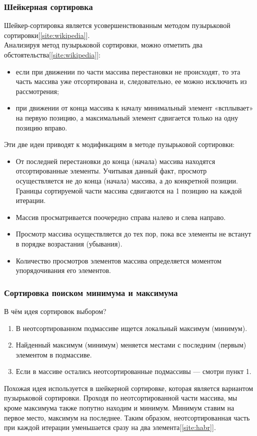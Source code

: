 \documentclass[a4paper,12pt]{article}
\begin{document}
\subsubsection{Шейкерная сортировка}
Шейкер-сортировка является усовершенствованным методом пузырьковой сортировки[\ref{site:wikipedia}]. \\
Анализируя метод пузырьковой сортировки, можно отметить два обстоятельства[\ref{site:wikipedia}]:
\begin{itemize}
\item если при движении по части массива перестановки не происходят, то эта часть массива уже отсортирована и, следовательно, ее можно исключить из рассмотрения;
\item при движении от конца массива к началу минимальный элемент «всплывает» на первую позицию, а максимальный элемент сдвигается только на одну позицию вправо.
\end{itemize}
Эти две идеи приводят к модификациям в методе пузырьковой сортировки:
\begin{itemize}
\item От последней перестановки до конца (начала) массива находятся отсортированные элементы. Учитывая данный факт, просмотр осуществляется не до конца (начала) массива, а до конкретной позиции. Границы сортируемой части массива сдвигаются на 1 позицию на каждой итерации.
\item Массив просматривается поочередно справа налево и слева направо.
\item Просмотр массива осуществляется до тех пор, пока все элементы не встанут в порядке возрастания (убывания).
\item Количество просмотров элементов массива определяется моментом упорядочивания его элементов.
\end{itemize}

\subsubsection{Сортировка поиском минимума и максимума}
В чём идея сортировок выбором?
\begin{enumerate}
\item В неотсортированном подмассиве ищется локальный максимум (минимум).
\item Найденный максимум (минимум) меняется местами с последним (первым) элементом в подмассиве.
\item Если в массиве остались неотсортированные подмассивы — смотри пункт 1.
\end{enumerate}
Похожая идея используется в шейкерной сортировке, которая является вариантом пузырьковой сортировки. Проходя по неотсортированной части массива, мы кроме максимума также попутно находим и минимум. Минимум ставим на первое место, максимум на последнее. Таким образом, неотсортированная часть при каждой итерации уменьшается сразу на два элемента[\ref{site:habr}].
\end{document}
